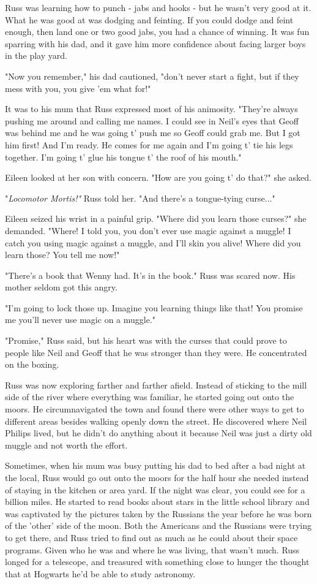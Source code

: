 \documentclass[a4paper,11pt]{article}
\begin{document}
Russ was learning how to punch - jabs and hooks - but he wasn't very good at it. What he was good at was dodging and feinting. If you could dodge and feint enough, then land one or two good jabs, you had a chance of winning. It was fun sparring with his dad, and it gave him more confidence about facing larger boys in the play yard.

"Now you remember," his dad cautioned, "don't never start a fight, but if they mess with you, you give 'em what for!"

It was to his mum that Russ expressed most of his animosity. "They're always pushing me around and calling me names. I could see in Neil's eyes that Geoff was behind me and he was going t' push me so Geoff could grab me. But I got him first! And I'm ready. He comes for me again and I'm going t' tie his legs together. I'm going t' glue his tongue t' the roof of his mouth."

Eileen looked at her son with concern. "How are you going t' do that?" she asked.

"\emph{Locomotor Mortis!"} Russ told her. "And there's a tongue-tying curse..."

Eileen seized his wrist in a painful grip. "Where did you learn those curses?" she demanded. "Where! I told you, you don't ever use magic against a muggle! I catch you using magic against a muggle, and I'll skin you alive! Where did you learn those? You tell me now!"

"There's a book that Wenny had. It's in the book." Russ was scared now. His mother seldom got this angry.

"I'm going to lock those up. Imagine you learning things like that! You promise me you'll never use magic on a muggle."

"Promise," Russ said, but his heart was with the curses that could prove to people like Neil and Geoff that he was stronger than they were. He concentrated on the boxing.

Russ was now exploring farther and farther afield. Instead of sticking to the mill side of the river where everything was familiar, he started going out onto the moors. He circumnavigated the town and found there were other ways to get to different areas besides walking openly down the street. He discovered where Neil Philips lived, but he didn't do anything about it because Neil was just a dirty old muggle and not worth the effort.

Sometimes, when his mum was busy putting his dad to bed after a bad night at the local, Russ would go out onto the moors for the half hour she needed instead of staying in the kitchen or area yard. If the night was clear, you could see for a billion miles. He started to read books about stars in the little school library and was captivated by the pictures taken by the Russians the year before he was born of the 'other' side of the moon. Both the Americans and the Russians were trying to get there, and Russ tried to find out as much as he could about their space programs. Given who he was and where he was living, that wasn't much. Russ longed for a telescope, and treasured with something close to hunger the thought that at Hogwarts he'd be able to study astronomy.
\end{document}
